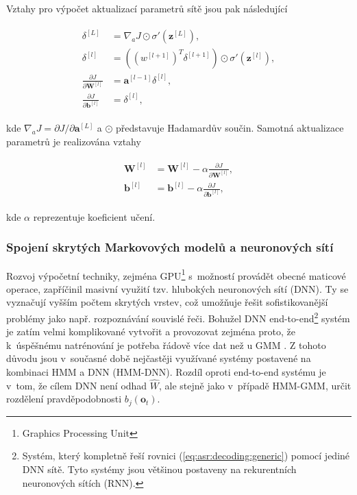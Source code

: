 \noindent Vztahy pro výpočet aktualizací parametrů sítě jsou pak následující

\begin{align}
  \begin{split}
    \delta^{[L]} & = \nabla_{a} J \odot \sigma'\left(\mathbf{z}^{[L]}\right), \\
    \delta^{[l]} & = \left(\left(w^{[l+1]}\right)^T \delta^{[l+1]}\right) \odot \sigma'\left(\mathbf{z}^{[l]}\right), \\
    \frac{\partial J}{\partial \mathbf{W}^{[l]}} & = \mathbf{a}^{[l-1]}\delta^{[l]}, \\
    \frac{\partial J}{\partial \mathbf{b}^{[l]}} & = \delta^{[l]},
  \end{split}
  \label{eq:asr:acoustic:dnn:bp}
\end{align}

\noindent kde $\nabla_a J = \partial J / \partial \mathbf{a}^{[L]}$ a $\odot$ představuje Hadamardův součin. Samotná aktualizace parametrů je realizována vztahy

\begin{align}
  \begin{split}
    \mathbf{W}^{[l]} & = \mathbf{W}^{[l]} - \alpha \frac{\partial J}{\partial \mathbf{W}^{[l]}}, \\
    \mathbf{b}^{[l]} & = \mathbf{b}^{[l]} - \alpha \frac{\partial J}{\partial \mathbf{b}^{[l]}},
  \end{split}
  \label{eq:asr:acoustic:dnn:update}
\end{align}

\noindent kde $\alpha$ reprezentuje koeficient učení.

\subsubsection{Spojení skrytých Markovových modelů a neuronových sítí}

Rozvoj výpočetní techniky, zejména GPU\footnote{Graphics Processing Unit} s~možností provádět obecné maticové operace, zapříčinil masivní využití tzv. hlubokých neuronových sítí (DNN). Ty se vyznačují vyšším počtem skrytých vrstev, což umožňuje řešit sofistikovanější problémy jako např. rozpoznávání souvislé řeči. Bohužel DNN end-to-end\footnote{Systém, který kompletně řeší rovnici (\ref{eq:asr:decoding:generic}) pomocí jediné DNN sítě. Tyto systémy jsou většinou postaveny na rekurentních neuronových sítích (RNN).} systém je zatím velmi komplikované vytvořit a provozovat zejména proto, že  k~úspěšnému natrénování je potřeba řádově více dat než u GMM \cite{Amodei2016}. Z tohoto důvodu jsou v~současné době nejčastěji využívané systémy postavené na kombinaci HMM a DNN (HMM-DNN). Rozdíl oproti end-to-end systému je v~tom, že cílem DNN není odhad $\hat{W}$, ale stejně jako v~případě HMM-GMM, určit rozdělení pravděpodobnosti $b_j\left(\boldsymbol{o}_t\right)$.

